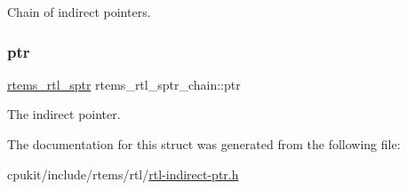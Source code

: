 Chain of indirect pointers. \mbox{\label{structrtems__rtl__sptr__chain_a9786f950c8e835d599e0b1018350ca68}} 
\subsubsection{\texorpdfstring{ptr}{ptr}}
{\footnotesize\ttfamily \mbox{\hyperlink{structrtems__rtl__sptr}{rtems\+\_\+rtl\+\_\+sptr}} rtems\+\_\+rtl\+\_\+sptr\+\_\+chain\+::ptr}

The indirect pointer. 

The documentation for this struct was generated from the following file\+:\begin{DoxyCompactItemize}
\item 
cpukit/include/rtems/rtl/\mbox{\hyperlink{rtl-indirect-ptr_8h}{rtl-\/indirect-\/ptr.\+h}}\end{DoxyCompactItemize}
